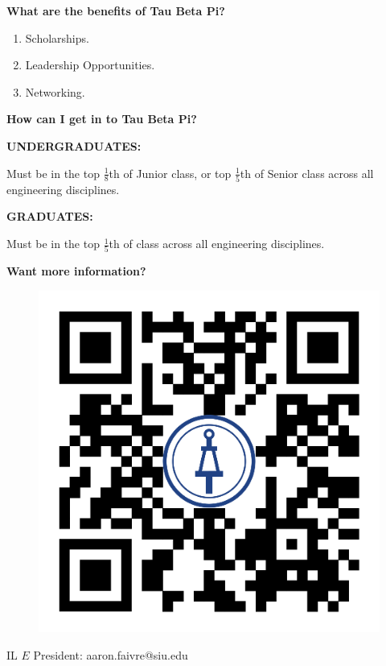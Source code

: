 \documentclass{extarticle}
\begin{document}
\bigskip
{\large \textbf{What are the benefits of Tau Beta Pi?}}

\begin{enumerate}
    \item Scholarships.
    \item Leadership Opportunities.
    \item Networking.
\end{enumerate}

\bigskip
{\large \textbf{How can I get in to Tau Beta Pi?}}

\bigskip
{\normalsize \textbf{UNDERGRADUATES:}}

Must be in the top \( \frac{1}{8} \)th of Junior class, or top \( \frac{1}{5} \)th of Senior class across all engineering disciplines.

\bigskip
{\normalsize \textbf{GRADUATES:}}

Must be in the top \( \frac{1}{5} \)th of class across all engineering disciplines.

\bigskip
{\large \textbf{Want more information?}}

\begin{figure}
    \centering
    \includegraphics[scale=0.1]{tbp-qr-code.png}
\end{figure}

\smallskip
IL \( E \) President: aaron.faivre@siu.edu
\end{document}
